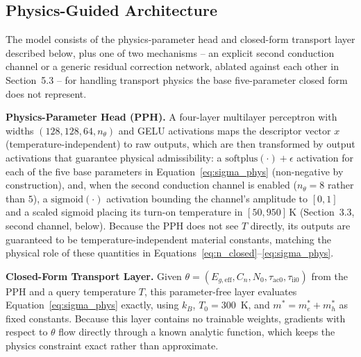 \documentclass[11pt]{article}
\begin{document}
\subsection{Physics-Guided Architecture}

The model consists of the physics-parameter head and closed-form transport layer described below, plus one of two mechanisms -- an explicit second conduction channel or a generic residual correction network, ablated against each other in Section~5.3 -- for handling transport physics the base five-parameter closed form does not represent.

\textbf{Physics-Parameter Head (PPH).} A four-layer multilayer perceptron with widths $(128, 128, 64, n_\theta)$ and GELU activations maps the descriptor vector $x$ (temperature-independent) to raw outputs, which are then transformed by output activations that guarantee physical admissibility: a $\text{softplus}(\cdot) + \epsilon$ activation for each of the five base parameters in Equation~\ref{eq:sigma_phys} (non-negative by construction), and, when the second conduction channel is enabled ($n_\theta = 8$ rather than $5$), a $\text{sigmoid}(\cdot)$ activation bounding the channel's amplitude to $[0,1]$ and a scaled sigmoid placing its turn-on temperature in $[50, 950]\,\text{K}$ (Section~3.3, second channel, below). Because the PPH does not see $T$ directly, its outputs are guaranteed to be temperature-independent material constants, matching the physical role of these quantities in Equations~\ref{eq:n_closed}--\ref{eq:sigma_phys}.

\textbf{Closed-Form Transport Layer.} Given $\theta = (E_{g,\text{eff}}, C_n, N_0, \tau_{\text{ac}0}, \tau_{\text{ii}0})$ from the PPH and a query temperature $T$, this parameter-free layer evaluates Equation~\ref{eq:sigma_phys} exactly, using $k_B$, $T_0 = 300$~K, and $m^{*} = m_e^{*} + m_h^{*}$ as fixed constants. Because this layer contains no trainable weights, gradients with respect to $\theta$ flow directly through a known analytic function, which keeps the physics constraint exact rather than approximate.
\end{document}
